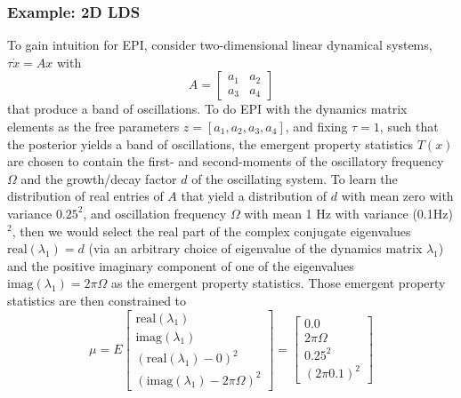 \documentclass[11pt]{article}
\begin{document}
\subsubsection{Example: 2D LDS}\label{methods_2DLDS}
To gain intuition for EPI, consider two-dimensional linear dynamical systems, $\tau \dot{x} = Ax$ with 
\[A = \begin{bmatrix} a_1 & a_2 \\ a_3 & a_4 \end{bmatrix}\]
 that produce a band of oscillations. To do EPI with the dynamics matrix elements as the free parameters $z = \left[a_1, a_2, a_3, a_4 \right]$, and fixing $\tau=1$, such that the posterior yields a band of oscillations, the emergent property statistics $T(x)$ are chosen to contain the first- and second-moments of the oscillatory frequency $\Omega$ and the growth/decay factor $d$ of the oscillating system.  To learn the distribution of real entries of $A$ that yield a distribution of $d$ with mean zero with variance $0.25^2$, and oscillation frequency $\Omega$ with mean 1 Hz with variance (0.1Hz)$^2$, then we would select the real part of the complex conjugate eigenvalues $\text{real}(\lambda_1) = d$ (via an arbitrary choice of eigenvalue of the dynamics matrix $\lambda_1$) and the positive imaginary component of one of the eigenvalues $\text{imag}(\lambda_1) = 2 \pi \Omega$ as the emergent property statistics.  Those emergent property statistics are then constrained to
\begin{equation}
 \mu = E \begin{bmatrix} \text{real}(\lambda_1) \\ \text{imag}(\lambda_1) \\ (\text{real}(\lambda_1)-0)^2  \\ (\text{imag}(\lambda_1)-2 \pi \Omega)^2 \end{bmatrix} = \begin{bmatrix} 0.0 \\ 2 \pi \Omega \\ 0.25^2 \\ (2 \pi 0.1)^2 \end{bmatrix}
 \end{equation} 
 
\end{document}
